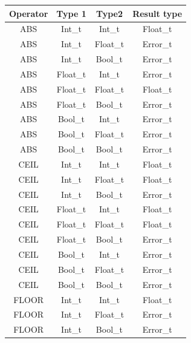 \begin{figure}[H]
    \centering
    \begin{tabular}{cccc}
        \toprule
        \textbf{Operator} & \textbf{Type 1} & \textbf{Type2} & \textbf{Result type}\\
        \midrule ABS & Int\_t & Int\_t      & Float\_t \\
        \midrule ABS & Int\_t & Float\_t    & Error\_t \\
        \midrule ABS & Int\_t & Bool\_t     & Error\_t \\

        \midrule ABS & Float\_t & Int\_t    & Error\_t \\
        \midrule ABS & Float\_t & Float\_t  & Float\_t \\
        \midrule ABS & Float\_t & Bool\_t   & Error\_t \\

        \midrule ABS & Bool\_t & Int\_t     & Error\_t \\
        \midrule ABS & Bool\_t & Float\_t   & Error\_t \\
        \midrule ABS & Bool\_t & Bool\_t    & Error\_t \\

        \midrule CEIL & Int\_t & Int\_t      & Float\_t \\
        \midrule CEIL & Int\_t & Float\_t    & Float\_t \\
        \midrule CEIL & Int\_t & Bool\_t     & Error\_t \\

        \midrule CEIL & Float\_t & Int\_t    & Float\_t \\
        \midrule CEIL & Float\_t & Float\_t  & Float\_t \\
        \midrule CEIL & Float\_t & Bool\_t   & Error\_t \\

        \midrule CEIL & Bool\_t & Int\_t     & Error\_t \\
        \midrule CEIL & Bool\_t & Float\_t   & Error\_t \\
        \midrule CEIL & Bool\_t & Bool\_t    & Error\_t \\

        \midrule FLOOR & Int\_t & Int\_t      & Float\_t \\
        \midrule FLOOR & Int\_t & Float\_t    & Error\_t \\
        \midrule FLOOR & Int\_t & Bool\_t     & Error\_t \\


\end{tabular}
\end{figure}
